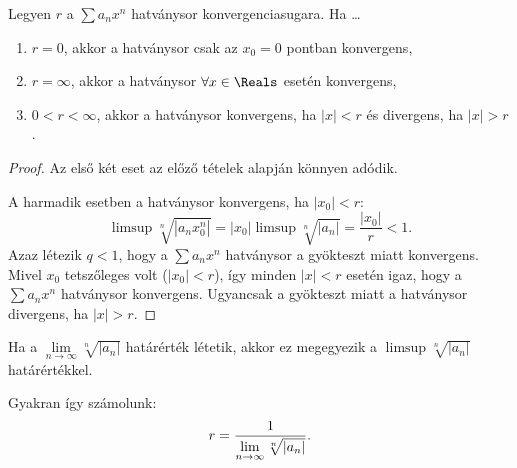 \begin{theorem}
  Legyen $r$ a $\sum a_n x^n$ hatványsor konvergenciasugara. Ha \dots
  \begin{enumerate}
    \item $r = 0$, akkor a hatványsor csak az $x_0 = 0$ pontban konvergens,
    \item $r = \infty$, akkor a hatványsor $\forall x \in \Reals$ esetén
          konvergens,
    \item $0 < r < \infty$, akkor a hatványsor konvergens, ha $|x| < r$ és
          divergens, ha $|x| > r$.
  \end{enumerate}

  \begin{center}
  \end{center}

  \begin{proof}
    Az első két eset az előző tételek alapján könnyen adódik.

    A harmadik esetben a hatványsor konvergens, ha $|x_0| < r$:
    $$
      \limsup \sqrt[n]{|a_n x_0^n|}
      = |x_0| \limsup \sqrt[n]{|a_n|}
      = \frac{|x_0|}{r}
      < 1.
    $$
    Azaz létezik $q < 1$, hogy a $\sum a_n x^n$ hatványsor a gyökteszt miatt
    konvergens. Mivel $x_0$ tetszőleges volt ($|x_0| < r$), így minden $|x| < r$
    esetén igaz, hogy a $\sum a_n x^n$ hatványsor konvergens. Ugyancsak a
    gyökteszt miatt a hatványsor divergens, ha $|x| > r$.
  \end{proof}
\end{theorem}

\begin{note}
  Ha a $\lim\limits_{n \to \infty} \sqrt[n]{|a_n|}$ határérték létetik, akkor ez
  megegyezik a $\limsup \sqrt[n]{|a_n|}$ határértékkel.

  Gyakran így számolunk:
  $$
    r = \frac{1}{\lim\limits_{n \to \infty} \sqrt[n]{|a_n|}}
    \text.
  $$
\end{note}

